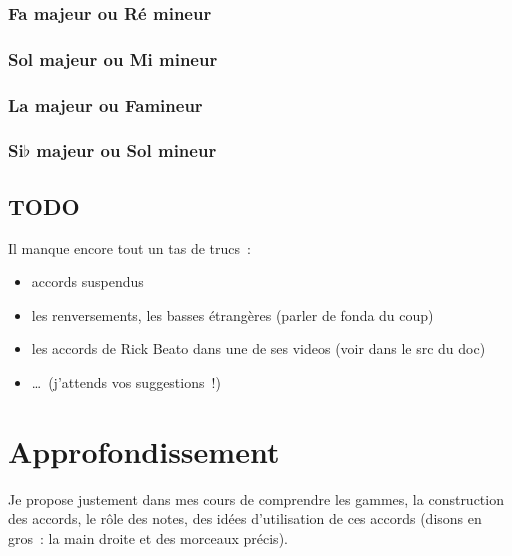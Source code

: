 \documentclass[11pt]{article}
\begin{document}
\subsubsection{Fa majeur ou Ré mineur}


\subsubsection{Sol majeur ou Mi mineur}


\subsubsection{La majeur ou Fa\shrp mineur}


\subsubsection{Si$\flat$ majeur ou Sol mineur}


\subsection{TODO}



Il manque encore tout un tas de trucs~:

\begin{itemize}
\item accords suspendus
\item les renversements, les basses étrangères (parler de fonda du coup)
\item les accords de Rick Beato dans une de ses videos (voir dans le src du doc)
\item \ldots~(j’attends vos suggestions~!)
\end{itemize}

\section{Approfondissement} \label{approf}

Je propose justement dans mes cours de comprendre les gammes, la construction
des accords, le rôle des notes, des idées d’utilisation de ces accords (disons
en gros~: la main droite et des morceaux précis).
\end{document}
